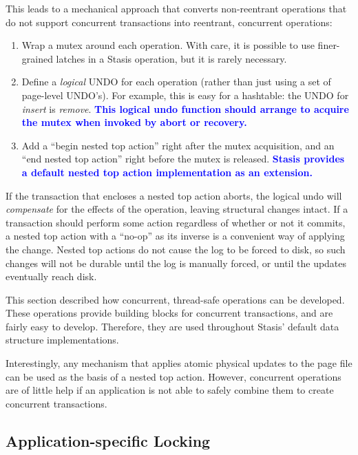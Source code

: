 \documentclass[letterpaper,twocolumn,10pt]{article}
\newcommand{\yad}{Stasis\xspace}
\newcommand{\yads}{Stasis'\xspace}
\newcommand{\diff}[1]{\textcolor{blue}{\bf #1}}
\begin{document}
This leads to a mechanical approach that converts non-reentrant
operations that do not support concurrent transactions into reentrant,
concurrent operations:

\begin{enumerate}
\item Wrap a mutex around each operation.  With care, it is possible 
  to use finer-grained latches in a \yad operation, but it is rarely necessary.
\item Define a {\em logical} UNDO for each operation (rather than just
  using a set of page-level UNDO's).  For example, this is easy for a
  hashtable: the UNDO for {\em insert} is {\em remove}.  \diff{This logical
  undo function should arrange to acquire the mutex when invoked by
  abort or recovery.}
\item Add a ``begin nested
  top action'' right after the mutex acquisition, and an ``end
  nested top action'' right before the mutex is released.  \diff{\yad provides a default nested top action implementation as an extension.}
\end{enumerate}

If the transaction that encloses a nested top action aborts, the
logical undo will {\em compensate} for the effects of the operation,
leaving structural changes intact.  If a transaction should perform
some action regardless of whether or not it commits, a nested top
action with a ``no-op'' as its inverse is a convenient way of applying
the change.  Nested top actions do not cause the log to be forced to disk, so
such changes will not be durable until the log is manually forced, or
until the updates eventually reach disk.

This section described how concurrent, thread-safe operations can be
developed.  These operations provide building blocks for concurrent
transactions, and are fairly easy to develop.  Therefore, they are
used throughout \yads default data structure implementations.  

Interestingly, any mechanism that applies atomic physical updates to
the page file can be used as the basis of a nested top action.
However, concurrent operations are of little help if an application is
not able to safely combine them to create concurrent transactions.

\subsection{Application-specific Locking}
\end{document}
